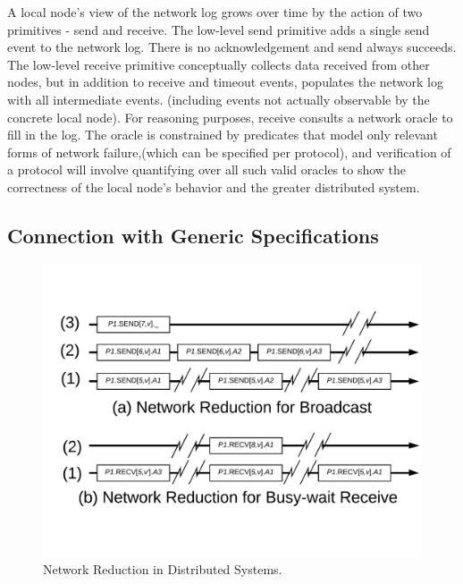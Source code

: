 A local node's view of the network log grows over time by the action of two
primitives - send and receive. The low-level send primitive adds a single send
event to the network log. There is no acknowledgement and send always succeeds.
The low-level receive primitive conceptually collects data received from other
nodes, but in addition to receive and timeout events, populates the network log
with all intermediate events. (including events not actually observable by the
concrete local node). For reasoning purposes, receive consults a network oracle
to fill in the log. The oracle is constrained by predicates that model only
relevant forms of network failure,(which can be specified per protocol), and
verification of a protocol will involve quantifying over all such valid oracles
to show the correctness of the local node's behavior and the greater distributed
system.

\subsection{Connection with Generic Specifications}
\label{chapter:witnesspassing:subsec:connection}

\begin{figure}
\begin{center}
\includegraphics[scale=0.35]{figs/witnesspassing/network_reduction.pdf}
\end{center}
\caption{Network Reduction in Distributed Systems.}
\label{fig:chapter:witnesspassing:network-reduction}
\end{figure}


